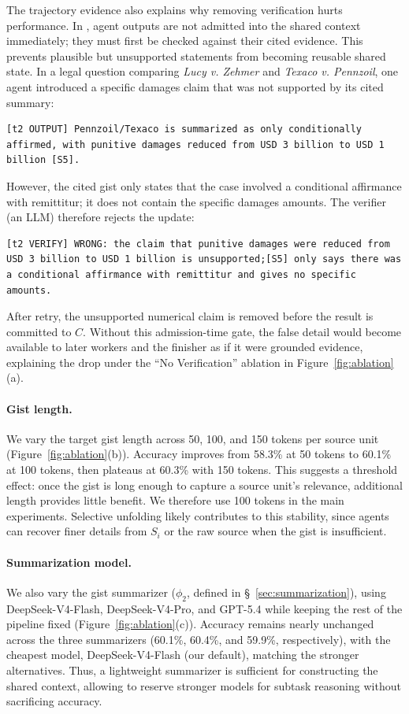The trajectory evidence also explains why removing verification hurts performance. In \toolName{}, agent outputs are not admitted into the shared context immediately; they must first be checked against their cited evidence. This prevents plausible but unsupported statements from becoming reusable shared state. In a legal question comparing \textit{Lucy v. Zehmer} and \textit{Texaco v. Pennzoil}, one agent introduced a specific damages claim that was not supported by its cited summary:
\begin{lstlisting}[style=gist]
[t2 OUTPUT] Pennzoil/Texaco is summarized as only conditionally affirmed, with punitive damages reduced from USD 3 billion to USD 1 billion [S5].
\end{lstlisting}
However, the cited gist only states that the case involved a conditional affirmance with remittitur; it does not contain the specific damages amounts. The verifier (an LLM) therefore rejects the update:
\begin{lstlisting}[style=gist]
[t2 VERIFY] WRONG: the claim that punitive damages were reduced from USD 3 billion to USD 1 billion is unsupported;[S5] only says there was a conditional affirmance with remittitur and gives no specific amounts.
\end{lstlisting}
After retry, the unsupported numerical claim is removed before the result is committed to $C$. Without this admission-time gate, the false detail would become available to later workers and the finisher as if it were grounded evidence, explaining the drop under the ``No Verification'' ablation in Figure~\ref{fig:ablation}(a).

\paragraph{Gist length.}
We vary the target gist length across 50, 100, and 150 tokens per source unit (Figure~\ref{fig:ablation}(b)). Accuracy improves from 58.3\% at 50 tokens to 60.1\% at 100 tokens, then plateaus at 60.3\% with 150 tokens. This suggests a threshold effect: once the gist is long enough to capture a source unit's relevance, additional length provides little benefit. We therefore use 100 tokens in the main experiments. Selective unfolding likely contributes to this stability, since agents can recover finer details from $S_i$ or the raw source when the gist is insufficient.

\paragraph{Summarization model.}
We also vary the gist summarizer ($\phi_2$, defined in \S~\ref{sec:summarization}), using DeepSeek-V4-Flash, DeepSeek-V4-Pro, and GPT-5.4 while keeping the rest of the pipeline fixed (Figure~\ref{fig:ablation}(c)). Accuracy remains nearly unchanged across the three summarizers (60.1\%, 60.4\%, and 59.9\%, respectively), with the cheapest model, DeepSeek-V4-Flash (our default), matching the stronger alternatives. Thus, a lightweight summarizer is sufficient for constructing the shared context, allowing \toolName{} to reserve stronger models for subtask reasoning without sacrificing accuracy.

